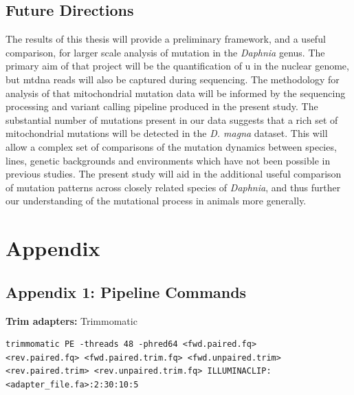 \documentclass[12pt,twoside]{reedthesis}
\begin{document}

\section{Future Directions}
The results of this thesis will provide a preliminary framework, and a useful comparison, for larger scale analysis of mutation in the \textit{Daphnia} genus.
The primary aim of that project will be the quantification of \gls{u} in the nuclear genome, but \gls{mtdna} reads will also be captured during sequencing.
The methodology for analysis of that mitochondrial mutation data will be informed by the sequencing processing and variant calling pipeline produced in the present study.
The substantial number of mutations present in our data suggests that a rich set of mitochondrial mutations will be detected in the \textit{D. magna} dataset.
This will allow a complex set of comparisons of the mutation dynamics between species, lines, genetic backgrounds and environments which have not been possible in previous studies. 
The present study will aid in the additional useful comparison of mutation patterns across closely related species of \textit{Daphnia}, and thus further our understanding of the mutational process in animals more generally.

\chapter*{Appendix}
\section{Appendix 1: Pipeline Commands}
\textbf{Trim adapters:} Trimmomatic \citep{bolger_trimmomatic:_2014}

\begin{lstlisting}
trimmomatic PE -threads 48 -phred64 <fwd.paired.fq> 
<rev.paired.fq> <fwd.paired.trim.fq> <fwd.unpaired.trim> 
<rev.paired.trim> <rev.unpaired.trim.fq> ILLUMINACLIP:
<adapter_file.fa>:2:30:10:5
\end{lstlisting} 
\end{document}
